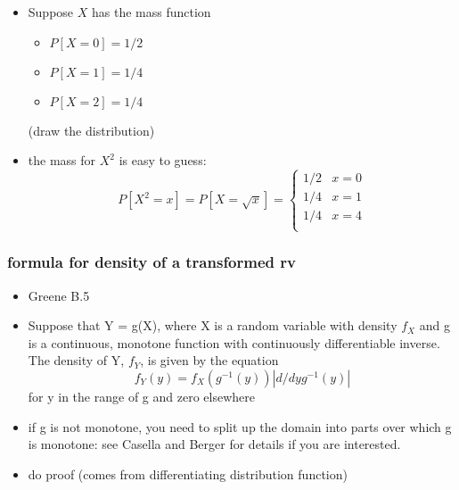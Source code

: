 \documentclass[11pt]{article}
\begin{document}
\begin{itemize}
\item Suppose $X$ has the mass function
\begin{itemize}
\item $P[X = 0] = 1/2$
\item $P[X = 1] = 1/4$
\item $P[X = 2] = 1/4$
\end{itemize}
(draw the distribution)
\item the mass for $X^2$ is easy to guess:
        \[P[X^2 = x] = P[X = \sqrt{x}] = \begin{cases}
          1/2 & x = 0 \\
          1/4 & x = 1 \\
          1/4 & x = 4 \\
        \end{cases}\]
\end{itemize}
\subsubsection{formula for density of a transformed rv}
\label{sec-3-5-3}

\begin{itemize}
\item Greene B.5
\item Suppose that Y = g(X), where X is a random variable with density
        $f_X$ and g is a continuous, monotone function with continuously
        differentiable inverse.  The
        density of Y, $f_Y$, is given by the equation
        \[ f_Y(y) = f_X(g^{-1}(y)) | d/dy g^{-1}(y) | \]
        for y in the range of g and zero elsewhere
\item if g is not monotone, you need to split up the domain into parts
        over which g is monotone: see Casella and Berger for details if
        you are interested.
\item do proof (comes from differentiating distribution function)
\end{itemize}
\end{document}
